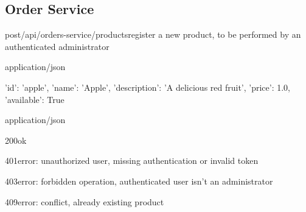 \subsection{Order Service}

\begin{apiRoute}{post}{/api/orders-service/products}{register a new product, to be performed by an authenticated administrator}
	\begin{routeParameter}
	\end{routeParameter}
	\begin{routeRequest}{application/json}
		\begin{routeRequestBody}
{
    'id': 'apple',
    'name': 'Apple',
    'description': 'A delicious red fruit',
    'price': 1.0,
    'available': True
}
		\end{routeRequestBody}
	\end{routeRequest}
	\begin{routeResponse}{application/json}
	    \begin{routeResponseItem}{200}{ok}
	        \begin{routeResponseItemBody}
			\end{routeResponseItemBody}
		\end{routeResponseItem}
    	\begin{routeResponseItem}{401}{error: unauthorized user, missing authentication or invalid token}
    	    \begin{routeResponseItemBody}
			\end{routeResponseItemBody}
		\end{routeResponseItem}
		\begin{routeResponseItem}{403}{error: forbidden operation, authenticated user isn't an administrator}
    	    \begin{routeResponseItemBody}
			\end{routeResponseItemBody}
		\end{routeResponseItem}
        \begin{routeResponseItem}{409}{error: conflict, already existing product}
            \begin{routeResponseItemBody}
			\end{routeResponseItemBody}
		\end{routeResponseItem}
	\end{routeResponse}
\end{apiRoute}

